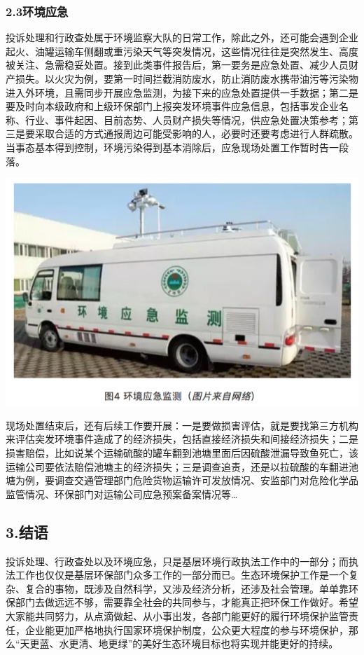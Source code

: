 \documentclass[]{book}
\begin{document}
\subsubsection{2.3环境应急}

投诉处理和行政查处属于环境监察大队的日常工作，除此之外，还可能会遇到企业起火、油罐运输车侧翻或重污染天气等突发情况，这些情况往往是突然发生、高度被关注、急需稳妥处置。接到此类事件报告后，第一要务是应急处置、减少人员财产损失。以火灾为例，要第一时间拦截消防废水，防止消防废水携带油污等污染物进入外环境，且需同步开展应急监测，为接下来的应急处置提供一手数据；第二是要及时向本级政府和上级环保部门上报突发环境事件应急信息，包括事发企业名称、行业、事件起因、目前态势、人员财产损失等情况，供应急处置决策参考；第三是要采取合适的方式通报周边可能受影响的人，必要时还要考虑进行人群疏散。当事态基本得到控制，环境污染得到基本消除后，应急现场处置工作暂时告一段落。

\includegraphics[width=8.33in]{images/hjzf4}

现场处置结束后，还有后续工作要开展：一是要做损害评估，就是要找第三方机构来评估突发环境事件造成了的经济损失，包括直接经济损失和间接经济损失；二是损害赔偿，比如说某个运输硫酸的罐车翻到池塘里面后因硫酸泄漏导致鱼死亡，该运输公司要依法赔偿池塘主的经济损失；三是调查追责，还是以拉硫酸的车翻进池塘为例，要调查交通管理部门危险货物运输许可发放情况、安监部门对危险化学品监管情况、环保部门对运输公司应急预案备案情况等\ldots{}

\subsection{3.结语}\label{-7}

投诉处理、行政查处以及环境应急，只是基层环境行政执法工作中的一部分；而执法工作也仅仅是基层环保部门众多工作的一部分而已。生态环境保护工作是一个复杂、复合的事物，既涉及自然科学，又涉及经济分析，还涉及社会管理。单单靠环保部门去做远远不够，需要靠全社会的共同参与，才能真正把环保工作做好。希望大家能共同努力，从点滴做起、从小事出发，各部门能更好的履行环境保护监管责任，企业能更加严格地执行国家环境保护制度，公众更大程度的参与环境保护，那么``天更蓝、水更清、地更绿''的美好生态环境目标也将实现并能更好的持续。
\end{document}
